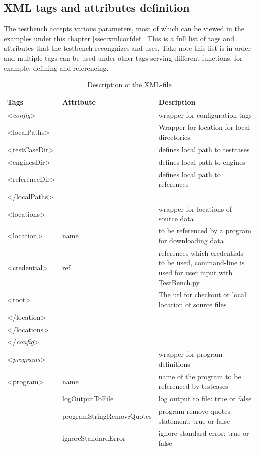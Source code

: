\documentclass{deltares_memo}
\newcommand\T{\rule{0pt}{2.6ex}}       %
\newcommand\B{\rule[-1.2ex]{0pt}{0pt}} %
\begin{document}
\subsection{XML tags and attributes definition}
The testbench accepts various parameters, most of which can be viewed in the examples under this chapter \autoref{ssec:xmlconfdef}. This is a full list of tags and attributes that the testbench recongnizes and uses. Take note this list is in order and multiple tags can be used under other tags serving different functions, for example: defining and referencing.
\begin{longtable}{p{30mm}p{45mm}p{\textwidth - 75mm - 36pt}}
\caption{Description of the XML-file} \\
\hline
\T
\textbf{Tags} &  \textbf{Attribute} & \textbf{Desription} \B \\
\hline
\endhead
\hline
\endfoot
<\emph{config}> & & wrapper for configuration tags \\
 <localPaths> & & Wrapper for location for local directories \\
  <testCaseDir> & &  defines local path to testcases \\
  <enginesDir> & & defines local path to engines \\
  <referenceDir> & & defines local path to references \\
 </localPaths> & & \\
 <locations> & & wrapper for locations of source data \\
  <location> & name & to be referenced by a program for downloading data \\
   <credential> & ref & references which credentials to be used, command-line is used for user input with TestBench.py \\
   <root> & & The url for checkout or local location of source files \\
  </location> & & \\
 </locations> & & \\
</\emph{config}> & & \\
\newpage
<\emph{programs}> & & wrapper for program definitions \\
 <program> & name & name of the program to be referenced by testcases \\
     & logOutputToFile & log output to file: true or false \\
     & programStringRemoveQuotes & program remove quotes statement: true or false \\
     & ignoreStandardError & ignore standard error: true or false\\

\end{longtable}
\end{document}
